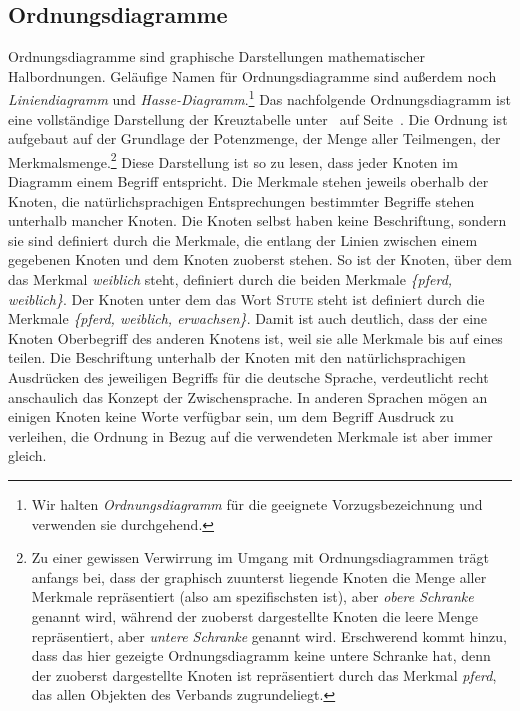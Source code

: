\documentclass[pagesize,paper=A4,DIV=calc,fontsize=12pt,draft=false]{scrreprt}
\begin{document}
\subsection{Ordnungsdiagramme}

Ordnungsdiagramme sind graphische Darstellungen mathematischer Halbordnungen. 
Geläufige Namen für Ordnungsdiagramme sind außerdem noch \emph{Liniendiagramm} und \emph{Hasse-Diagramm}.\footnote{Wir halten \emph{Ordnungsdiagramm} für die geeignete Vorzugsbezeichnung und verwenden sie durchgehend.}
Das nachfolgende Ordnungsdiagramm ist eine vollständige Darstellung der Kreuztabelle unter\emph{~} auf Seite~\pageref{subsec:fba}.
Die Ordnung ist aufgebaut auf der Grundlage der Potenzmenge, der Menge aller Teilmengen, der Merkmalsmenge.\footnote{Zu einer gewissen Verwirrung im Umgang mit Ordnungsdiagrammen trägt anfangs bei, dass der graphisch zuunterst liegende Knoten die Menge aller Merkmale repräsentiert (also am spezifischsten ist), aber \emph{obere Schranke} genannt wird, während der zuoberst dargestellte Knoten die leere Menge repräsentiert, aber \emph{untere Schranke} genannt wird. 
Erschwerend kommt hinzu, dass das hier gezeigte Ordnungsdiagramm keine untere Schranke hat, denn der zuoberst dargestellte Knoten ist repräsentiert durch das Merkmal \emph{pferd}, das allen Objekten des Verbands zugrundeliegt.}
Diese Darstellung ist so zu lesen, dass jeder Knoten im Diagramm einem Begriff entspricht.
Die Merkmale stehen jeweils oberhalb der Knoten, die natürlichsprachigen Entsprechungen bestimmter Begriffe stehen unterhalb mancher Knoten.
Die Knoten selbst haben keine Beschriftung, sondern sie sind definiert durch die Merkmale, die entlang der Linien zwischen einem gegebenen Knoten und dem Knoten zuoberst stehen.
So ist der Knoten, über dem das Merkmal \emph{weiblich} steht, definiert durch die beiden Merkmale \emph{\{pferd, weiblich\}}.
Der Knoten unter dem das Wort \textsc{Stute} steht ist definiert durch die Merkmale \emph{\{pferd, weiblich, erwachsen\}}.
Damit ist auch deutlich, dass der eine Knoten Oberbegriff des anderen Knotens ist, weil sie alle Merkmale bis auf eines teilen.
Die Beschriftung unterhalb der Knoten mit den natürlichsprachigen Ausdrücken des jeweiligen Begriffs für die deutsche Sprache, verdeutlicht recht anschaulich das Konzept der Zwischensprache.
In anderen Sprachen mögen an einigen Knoten keine Worte verfügbar sein, um dem Begriff Ausdruck zu verleihen, die Ordnung in Bezug auf die verwendeten Merkmale ist aber immer gleich.
\end{document}
